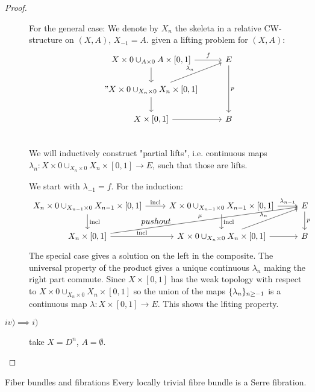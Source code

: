 \documentclass[language=english]{TemplateLecture}
\begin{document}
\begin{proof}
\begin{description}
        For the general case: We denote by \(X_n\) the skeleta in a relative CW-structure on \((X,A)\), \(X_{-1} = A\). given a lifting problem for \((X,A)\):
        \[\begin{tikzcd}
            X \times 0 \cup_{A \times 0} A \times [0,1] \ar[r, "f"] \ar[d] & E \ar[dd, "p"] \\
            "X\times 0 \cup_{X_n\times 0} X_n \times [0,1] \ar[d] \ar[ru, "\lambda_n"] & \\
            X \times [0,1] \ar[r] & B \\
        \end{tikzcd}\]
        We will inductively construct "partial lifts", i.e. continuous maps \(\lambda_n\colon X \times 0 \cup_{X_n \times 0} X_n \times [0,1] \to E\), such that those are lifts.

        We start with \(\lambda_{-1} = f\). For the induction:
        \[\begin{tikzcd}
            X_n \times 0 \cup _{X_{n-1} \times 0} X_{n-1} \times [0,1] \ar[dr, phantom, "pushout"] \ar[d, "\incl"] \ar[r, "\incl"] & X \times 0 \cup_{X_{n-1} \times 0} X_{n-1} \times [0,1] \ar[r, "\lambda_{n-1}"] \ar[d, "\incl"] & E \ar[d, "p"] \\
            X_n\times [0,1] \ar[r, "\incl"] \ar[rru, "\mu"] & X\times 0 \cup_{X_n \times 0} X_n \times[0,1] \ar[r] \ar[ru, "\lambda_n"] & B
        \end{tikzcd}\]
        The special case gives a solution on the left in the composite. The universal property of the product gives a unique continuous \(\lambda_n\) making the right part commute. Since \(X \times [0,1]\) has the weak topology with respect to \(X \times 0 \cup_{X_n \times 0} X_n \times [0,1]\) so the union of the maps \(\{\lambda_n\}_{n \geq -1}\) is a continuous map \(\lambda \colon X \times [0,1] \to E\). This shows the lfiting property.
        \item[\(iv) \implies i)\)] take \(X = D^n\), \(A = \emptyset\).
    \end{description}
\end{proof}

\begin{thm}{Fiber bundles and fibrations}{}
    Every locally trivial fibre bundle is a Serre fibration.
\end{thm}
\end{document}
